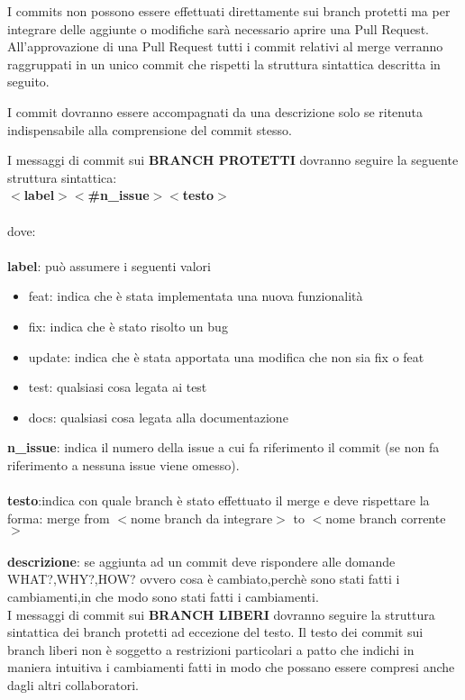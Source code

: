 I commits non possono essere effettuati direttamente sui branch protetti ma per integrare delle aggiunte o modifiche sarà necessario aprire una Pull Request.
All'approvazione di una Pull Request tutti i commit relativi al merge verranno raggruppati in un unico commit che rispetti la struttura sintattica descritta in seguito.

I commit dovranno essere accompagnati da una descrizione solo se ritenuta indispensabile alla comprensione del commit stesso.

I messaggi di commit sui \textbf{\uppercase{branch protetti}} dovranno seguire la seguente struttura sintattica:\\

\textbf{$<$label$>$$<$\#n\_issue$>$$<$testo$>$}\\\\
dove:\\\\
\textbf{label}: può assumere i seguenti valori
\begin{itemize}
\item feat: indica che è stata implementata una nuova funzionalità
\item fix: indica che è stato risolto un bug
\item update: indica che è stata apportata una modifica che non sia fix o feat
\item test: qualsiasi cosa legata ai test
\item docs: qualsiasi cosa legata alla documentazione
\end{itemize}
\textbf{n\_issue}: indica il numero della issue a cui fa riferimento il commit (se non fa riferimento a nessuna issue viene omesso).\\\\
\textbf{testo}:indica con quale branch è stato effettuato il merge e deve rispettare la forma: merge from $<$nome branch da integrare$>$ to $<$nome branch corrente$>$ \\\\
\textbf{descrizione}: se aggiunta ad un commit deve rispondere alle domande WHAT?,WHY?,HOW? ovvero
cosa è cambiato,perchè sono stati fatti i cambiamenti,in che modo sono stati fatti i cambiamenti.\\

I messaggi di commit sui \textbf{\uppercase{branch liberi}} dovranno seguire la struttura sintattica dei branch protetti ad eccezione del testo.
Il testo dei commit sui branch liberi non è soggetto a restrizioni particolari a patto che indichi in maniera intuitiva i cambiamenti fatti
in modo che possano essere compresi anche dagli altri collaboratori.




